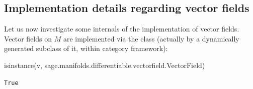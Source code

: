 \subsection{Implementation details regarding vector fields}

Let us now investigate some internals of the implementation of vector fields.
Vector fields on $M$ are implemented via the class
 (actually by a dynamically generated subclass of it, within \Sage{} category
framework):
\begin{NBin}
isinstance(v, sage.manifolds.differentiable.vectorfield.VectorField)
\end{NBin}
\begin{NBout}
\texttt{True}
\end{NBout}

